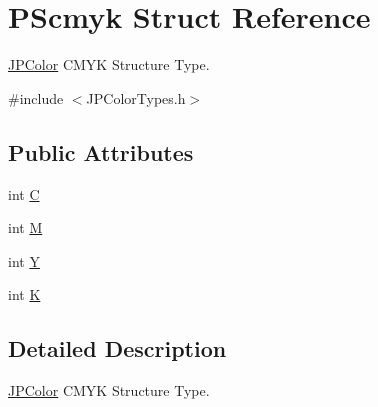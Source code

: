 \hypertarget{struct_p_scmyk}{
\section{PScmyk Struct Reference}
\label{struct_p_scmyk}
}


\hyperlink{interface_j_p_color}{JPColor} CMYK Structure Type.  




{\ttfamily \#include $<$JPColorTypes.h$>$}

\subsection*{Public Attributes}
\begin{DoxyCompactItemize}
\item 
int \hyperlink{struct_p_scmyk_a39bf406978a973d7d355fffeadb90790}{C}
\item 
int \hyperlink{struct_p_scmyk_a066376df21d88a3573fba8d4f222e347}{M}
\item 
int \hyperlink{struct_p_scmyk_a05cffa82f24c76cb1e9da6aced7556fa}{Y}
\item 
int \hyperlink{struct_p_scmyk_a06b48591efdd3cea844e1bc2f1cbd180}{K}
\end{DoxyCompactItemize}


\subsection{Detailed Description}
\hyperlink{interface_j_p_color}{JPColor} CMYK Structure Type. 

